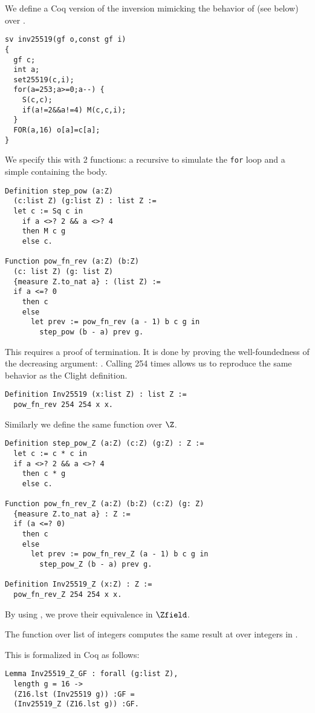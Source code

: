 We define a Coq version of the inversion mimicking
the behavior of  (see below) over .
\begin{lstlisting}[language=Ctweetnacl]
sv inv25519(gf o,const gf i)
{
  gf c;
  int a;
  set25519(c,i);
  for(a=253;a>=0;a--) {
    S(c,c);
    if(a!=2&&a!=4) M(c,c,i);
  }
  FOR(a,16) o[a]=c[a];
}
\end{lstlisting}
We specify this with 2 functions: a recursive 
to simulate the \texttt{for} loop and a simple  containing the body.
\begin{lstlisting}[language=Coq]
Definition step_pow (a:Z)
  (c:list Z) (g:list Z) : list Z :=
  let c := Sq c in
    if a <>? 2 && a <>? 4
    then M c g
    else c.

Function pow_fn_rev (a:Z) (b:Z)
  (c: list Z) (g: list Z)
  {measure Z.to_nat a} : (list Z) :=
  if a <=? 0
    then c
    else
      let prev := pow_fn_rev (a - 1) b c g in
        step_pow (b - a) prev g.
\end{lstlisting}
This  requires a proof of termination. It is done by proving the
well-foundedness of the decreasing argument: . Calling
 254 times allows us to reproduce the same behavior as the Clight definition.
\begin{lstlisting}[language=Coq]
Definition Inv25519 (x:list Z) : list Z :=
  pow_fn_rev 254 254 x x.
\end{lstlisting}
Similarly we define the same function over $\Z$.
\begin{lstlisting}[language=Coq]
Definition step_pow_Z (a:Z) (c:Z) (g:Z) : Z :=
  let c := c * c in
  if a <>? 2 && a <>? 4
    then c * g
    else c.

Function pow_fn_rev_Z (a:Z) (b:Z) (c:Z) (g: Z)
  {measure Z.to_nat a} : Z :=
  if (a <=? 0)
    then c
    else
      let prev := pow_fn_rev_Z (a - 1) b c g in
        step_pow_Z (b - a) prev g.

Definition Inv25519_Z (x:Z) : Z :=
  pow_fn_rev_Z 254 254 x x.
\end{lstlisting}
By using , we prove their equivalence in $\Zfield$.
\begin{lemma}
\label{lemma:Inv_equivalence}
The function  over list of integers computes the same
result at  over integers in \Zfield.
\end{lemma}
This is formalized in Coq as follows:
\begin{lstlisting}[language=Coq]
Lemma Inv25519_Z_GF : forall (g:list Z),
  length g = 16 ->
  (Z16.lst (Inv25519 g)) :GF =
  (Inv25519_Z (Z16.lst g)) :GF.
\end{lstlisting}

